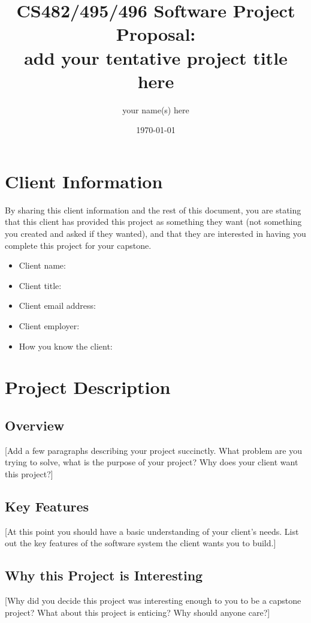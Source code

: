 \documentclass{article}
\title{CS482/495/496 Software Project Proposal: \\ 
add your tentative project title here}
\author{your name(s) here }
\date{\today}
\begin{document}
\maketitle %

\section{Client Information}
By sharing this client information and the rest of this document, you are stating that this client has provided this project as something they want (not something you created and asked if they wanted), and that they are interested in having you complete this project for your capstone.
\begin{itemize}
    \item Client name:
    \item Client title:
    \item Client email address:
    \item Client employer:
    \item How you know the client:
\end{itemize}

\section{Project Description}

\subsection{Overview}
[Add a few paragraphs describing your project succinctly. What problem are you trying to solve, what is the purpose of your project? Why does your client want this project?]

\subsection{Key Features}
[At this point you should have a basic understanding of your client's needs. List out the key features of the software system the client wants you to build.]

\subsection{Why this Project is Interesting}
[Why did you decide this project was interesting enough to you to be a capstone project? What about this project is enticing? Why should anyone care?]
\end{document}
